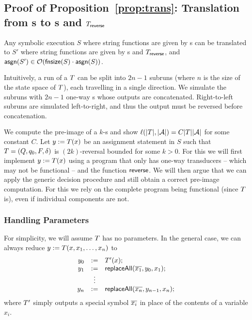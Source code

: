 \subsection{Proof of Proposition~\ref{prop:trans}: Translation from \SPPT{}s to \PT{}s and $T_{\sf reverse}$}

	Any symbolic execution $S$ where string functions are given by \SPPT{}s can be translated to $S'$ where string functions are given by \PT{}s and $T_{\sf reverse}$, and $ \mathsf{asgn}(S')\in \mathcal{O}(\mathsf{fnsize}(S) \cdot \mathsf{asgn}(S))$. 

Intuitively, a run of a \SPPT{} $T$ can be split into $2n-1$ subruns (where $n$ is the size of the state space of $T$), each travelling in a single direction.
We simulate the subruns with $2n-1$ one-way \PT{}s whose outputs are concatenated.
Right-to-left subruns are simulated left-to-right, and thus the output must be reversed before concatenation.





We compute the pre-image of a $k$-\RBPPT{}s and show
$\ell(|T|, |\mathcal{A}|) = C|T||\mathcal{A}|$
for some constant $C$.
%
Let
$y := T(x)$
be an assignment statement in $S$ such that
$T = (Q, q_0, F, \delta)$
is $(2k)$-reversal bounded for some $k > 0$.
%
For this we will first implement
$y := T(x)$
using a program that only has one-way transducers -- which may not be
functional -- and the function $\mathsf{reverse}$.
%
We will then argue that we can apply the generic decision procedure and still
obtain a correct pre-image computation.
%
For this we rely on the complete program being functional (since $T$
is), even if individual components are not.

\subsubsection{Handling Parameters}

For simplicity, we will assume $T$ has no parameters.
%
In the general case, we can always reduce
$y := T(x, x_1, \ldots, x_n)$
to
\[
    \begin{array}{rcl}
        y_0 &:=& T'(x); \\
        y_1 &:=& \mathsf{replaceAll}(\overline{x_1}, y_0, x_1); \\
            &\vdots& \\
        y_n &:=& \mathsf{replaceAll}(\overline{x_n}, y_{n-1}, x_n);
    \end{array}
\]
where $T'$ simply outputs a special symbol $\overline{x_i}$ in place of
the contents of a variable $x_i$.

